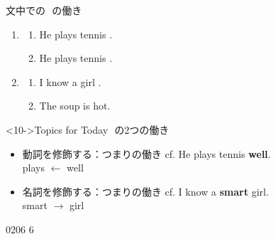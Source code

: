 \documentclass[aspectratio=169,xcolor={dvipsnames,table}]{beamer}
\begin{document}
\begin{frame}[plain]{文中での\,\,\,\,の働き}
 
\begin{enumerate}
 \item<2-> \begin{enumerate}
	\item<2-> He plays tennis .%
\hfill{}
	\item<4-> He plays tennis .%
\hfill{}
       \end{enumerate}
 \item<6-> \begin{enumerate}
	\item<6-> I know a girl .
\hfill{}
	\item<8-> The soup  is hot.
\hfill{}
       \end{enumerate}
\end{enumerate}

\begin{block}<10->{Topics for Today}
 \,\,の2つの働き

\begin{itemize}[square]
 \item<11-> 動詞を修飾する：つまりの働き%
\hfill{}{\scriptsize cf. He plays tennis \textbf{well}.}\\[-2pt]
\hfill{}{\scriptsize plays $\longleftarrow$ well}
 \item<12-> 名詞を修飾する：つまりの働き
\hfill{}{\scriptsize cf. I know a \textbf{smart} girl.}\\[-2pt]
\hfill{}{\scriptsize smart $\longrightarrow$ girl}
\end{itemize}

\hfill{}
\end{block}

\vspace{-12pt}

\hfill{\tiny 0206}\,{\scriptsize {}\,6}

\end{frame}
\end{document}
